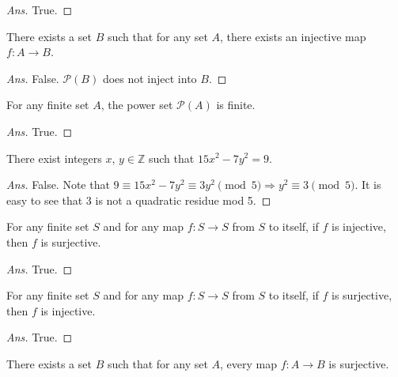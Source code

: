 \documentclass[12pt]{article}
\newenvironment{problem}[2][Problem]{\begin{trivlist}
\item[\hskip \labelsep {\bfseries #1}\hskip \labelsep {\bfseries #2.}]}{\end{trivlist}}
\begin{document}
\begin{proof}[Ans]
True.
\end{proof}

\begin{problem}{10}
There exists a set $B$ such that for any set $A$, there exists an injective map
$f : A \rightarrow B$.

\end{problem}

\begin{proof}[Ans]
False. $\mathcal{P}(B)$ does not inject into $B$.
\end{proof}

\begin{problem}{11}
For any finite set $A$, the power set $\mathcal{P}(A)$ is finite.
\end{problem}

\begin{proof}[Ans]
True.
\end{proof}

\begin{problem}{12}
There exist integers $x$, $y \in \mathbb{Z}$ such that $15x^2 - 7y^2 = 9$.
\end{problem}

\begin{proof}[Ans]
False. Note that $9 \equiv 15x^2 - 7y^2 \equiv 3y^2 \pmod{5} \Rightarrow y^2 \equiv 3 \pmod{5}$. It is easy to see that $3$ is not a quadratic residue mod 5. 
\end{proof}

\begin{problem}{13}
For any finite set $S$ and for any map $f : S \rightarrow S$ from $S$ to itself,
if $f$ is injective, then $f$ is surjective.
\end{problem}

\begin{proof}[Ans]
True.
\end{proof}

\begin{problem}{14}
For any finite set $S$ and for any map $f : S \rightarrow S$ from $S$ to itself,
if $f$ is surjective, then $f$ is injective.
\end{problem}

\begin{proof}[Ans]
True.
\end{proof}

\begin{problem}{15}
There exists a set $B$ such that for any set $A$,
every map $f : A \rightarrow B$ is surjective.
\end{problem}
\end{document}
